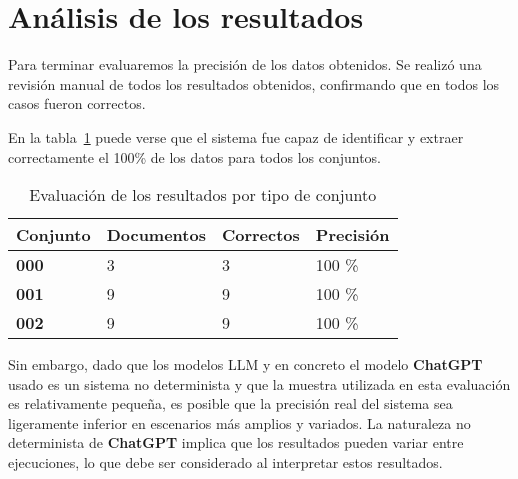 \section{Análisis de los resultados}

Para terminar evaluaremos la precisión de los datos obtenidos.
Se realizó una revisión manual de todos los resultados obtenidos, confirmando que en todos los casos fueron
correctos.

En la tabla~\ref{tab:data_set_performance} puede verse que el sistema fue capaz de identificar y extraer
correctamente el 100\% de los datos para todos los conjuntos.

\begin{table}[h]
    \renewcommand{\arraystretch}{1.5}
    \setlength{\tabcolsep}{10pt}
    \begin{tabular}{>{\bfseries}p{} p{} p{} p{}}
        \toprule
        \textbf{Conjunto} & \textbf{Documentos} & \textbf{Correctos} & \textbf{Precisión} \\
        \midrule
        \textbf{000}      & 3                   & 3                  & 100 \%             \\
        \textbf{001}      & 9                   & 9                  & 100 \%             \\
        \textbf{002}      & 9                   & 9                  & 100 \%             \\
        \bottomrule
    \end{tabular}
    \caption{Evaluación de los resultados por tipo de conjunto}
    \label{tab:data_set_performance}
\end{table}

Sin embargo, dado que los modelos LLM y en concreto el modelo \textbf{ChatGPT} usado es un sistema no determinista y
que la muestra utilizada en esta evaluación es relativamente pequeña, es posible que la precisión real del sistema sea
ligeramente inferior en escenarios más amplios y variados.
La naturaleza no determinista de \textbf{ChatGPT}
implica que los resultados pueden variar entre ejecuciones, lo que debe ser considerado al interpretar estos resultados.
